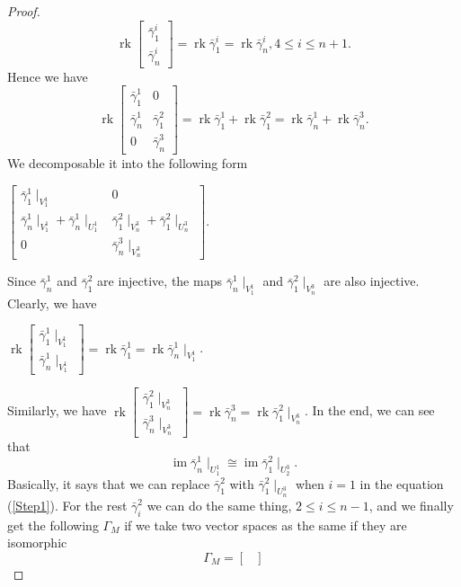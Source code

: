 \documentclass[a4paper,12pt]{amsart}
\newcommand{\bg}{\bar{\gamma}}
\DeclareMathOperator{\rk}{rk}
\DeclareMathOperator{\im}{im}
\begin{document}
\begin{proof}
\begin{equation}\label{r1}
\rk \begin{bmatrix}
\bg^i_1\\
\bg^i_n
\end{bmatrix}=\rk \bg^i_1=\rk \bg^i_n, 4\leq i\leq n+1.
\end{equation}
Hence we have 
\begin{equation}\label{r2}
\rk \begin{bmatrix}
\bg^1_1& 0\\
\bg^1_n & \bg^2_1 \\
0 & \bg^3_n
\end{bmatrix}=\rk \bg^1_1+\rk \bg^2_1=\rk \bg^1_n+\rk \bg^3_n .
\end{equation}
We decomposable it into  the following form

\begin{center}
$ \begin{bmatrix}
\bg^1_1\mid_{V^1_1} & 0 \\
\bg^1_n\mid_{V^1_1}+ \bg^1_n\mid_{U^1_1} & \bg^2_1\mid_{V^3_n}+\bg^2_1\mid_{U^3_n}\\
0 & \bg^3_n\mid_{V^3_n}
\end{bmatrix}. $
\end{center}
Since $\bg^1_n$ and $\bg^2_1$ are injective, the maps $\bg^1_n\mid_{V^1_1}$ and $\bg^2_1\mid_{V^3_n}$ are also injective. Clearly, we have 
\begin{center}
$\rk \begin{bmatrix}
\bg^1_1\mid_{V^1_1}\\
\bg^1_n\mid_{V^1_1}
\end{bmatrix}=\rk \bg^1_1=\rk \bg^1_n\mid_{V^1_1}$.
\end{center}
Similarly, we have  $\rk \begin{bmatrix}
\bg^2_1\mid_{V^3_n} \\
\bg^3_n\mid_{V^3_n}
\end{bmatrix}=\rk \bg^3_n=\rk \bg^2_1\mid_{V^3_n}$. In the end, we can see that  
\begin{equation}\label{r3}
\im \bg^1_n\mid_{U^1_1}\cong \im \bg^2_1\mid_{U^3_2}.
\end{equation}
Basically, it says that we can replace $\bg^2_1$ with $\bg^2_1\mid_{U^{3}_n}$ when $i=1$ in the equation (\ref{Step1}). For the rest $\bg^2_i$ we can do the same thing, $2\leq i\leq n-1$, and  we finally  get the following  $\Gamma_M$ if we take two vector spaces as the same if they are isomorphic
\begin{equation}\label{cyc}
\Gamma_M=\begin{bmatrix}

\end{bmatrix}
\end{equation}
\end{proof}
\end{document}
